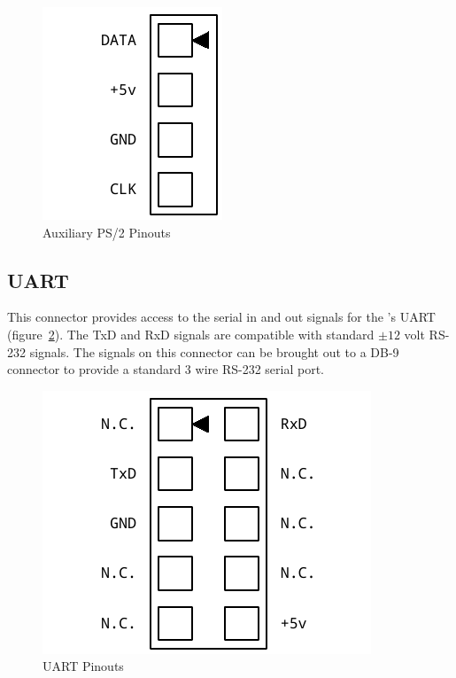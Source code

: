 \begin{figure}[ht]
    \begin{center}
        \includegraphics[scale=0.65]{images/f256_port_ps2.pdf}
    \end{center}
    \caption{Auxiliary PS/2 Pinouts}
    \label{fig:port_ps2}
\end{figure}

\subsection*{UART}

This connector provides access to the serial in and out signals for the \fjr's UART (figure~\ref{fig:port_uart}). The TxD and RxD signals are compatible with standard $\pm 12$ volt RS-232 signals. The signals on this connector can be brought out to a DB-9 connector to provide a standard 3 wire RS-232 serial port.

\begin{figure}[ht]
    \begin{center}
        \includegraphics[scale=0.65]{images/f256_port_uart.pdf}
    \end{center}
    \caption{UART Pinouts}
    \label{fig:port_uart}
\end{figure}

